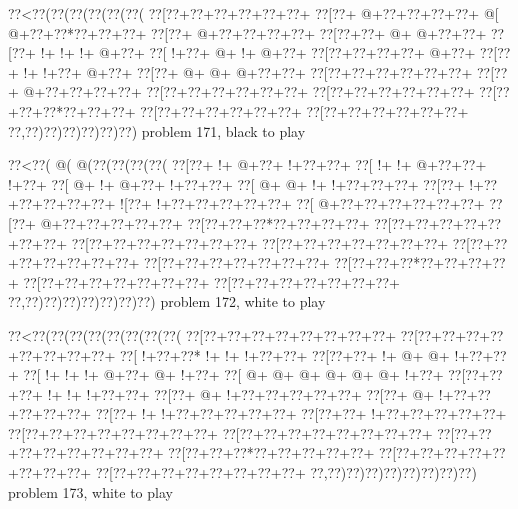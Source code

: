 \vbox{\vbox{\goo
\0??<\0??(\0??(\0??(\0??(\0??(\0??(
\0??[\0??+\0??+\0??+\0??+\0??+\0??+
\0??[\0??+\- @+\0??+\0??+\0??+\0??+
\- @[\- @+\0??+\0??*\0??+\0??+\0??+
\0??[\0??+\- @+\0??+\0??+\0??+\0??+
\0??[\0??+\0??+\- @+\- @+\0??+\0??+
\0??[\0??+\- !+\- !+\- !+\- @+\0??+
\0??[\- !+\0??+\- @+\- !+\- @+\0??+
\0??[\0??+\0??+\0??+\0??+\- @+\0??+
\0??[\0??+\- !+\- !+\0??+\- @+\0??+
\0??[\0??+\- @+\- @+\- @+\0??+\0??+
\0??[\0??+\0??+\0??+\0??+\0??+\0??+
\0??[\0??+\- @+\0??+\0??+\0??+\0??+
\0??[\0??+\0??+\0??+\0??+\0??+\0??+
\0??[\0??+\0??+\0??+\0??+\0??+\0??+
\0??[\0??+\0??+\0??*\0??+\0??+\0??+
\0??[\0??+\0??+\0??+\0??+\0??+\0??+
\0??[\0??+\0??+\0??+\0??+\0??+\0??+
\0??,\0??)\0??)\0??)\0??)\0??)\0??)
}
\hfil problem 171, black to play\hfil\break
}

\vbox{\vbox{\goo
\0??<\0??(\- @(\- @(\0??(\0??(\0??(\0??(
\0??[\0??+\- !+\- @+\0??+\- !+\0??+\0??+
\0??[\- !+\- !+\- @+\0??+\0??+\- !+\0??+
\0??[\- @+\- !+\- @+\0??+\- !+\0??+\0??+
\0??[\- @+\- @+\- !+\- !+\0??+\0??+\0??+
\0??[\0??+\- !+\0??+\0??+\0??+\0??+\0??+
\- ![\0??+\- !+\0??+\0??+\0??+\0??+\0??+
\0??[\- @+\0??+\0??+\0??+\0??+\0??+\0??+
\0??[\0??+\- @+\0??+\0??+\0??+\0??+\0??+
\0??[\0??+\0??+\0??*\0??+\0??+\0??+\0??+
\0??[\0??+\0??+\0??+\0??+\0??+\0??+\0??+
\0??[\0??+\0??+\0??+\0??+\0??+\0??+\0??+
\0??[\0??+\0??+\0??+\0??+\0??+\0??+\0??+
\0??[\0??+\0??+\0??+\0??+\0??+\0??+\0??+
\0??[\0??+\0??+\0??+\0??+\0??+\0??+\0??+
\0??[\0??+\0??+\0??*\0??+\0??+\0??+\0??+
\0??[\0??+\0??+\0??+\0??+\0??+\0??+\0??+
\0??[\0??+\0??+\0??+\0??+\0??+\0??+\0??+
\0??,\0??)\0??)\0??)\0??)\0??)\0??)\0??)
}
\hfil problem 172, white to play\hfil\break
}

\vbox{\vbox{\goo
\0??<\0??(\0??(\0??(\0??(\0??(\0??(\0??(\0??(
\0??[\0??+\0??+\0??+\0??+\0??+\0??+\0??+\0??+
\0??[\0??+\0??+\0??+\0??+\0??+\0??+\0??+\0??+
\0??[\- !+\0??+\0??*\- !+\- !+\- !+\0??+\0??+
\0??[\0??+\0??+\- !+\- @+\- @+\- !+\0??+\0??+
\0??[\- !+\- !+\- !+\- @+\0??+\- @+\- !+\0??+
\0??[\- @+\- @+\- @+\- @+\- @+\- @+\- !+\0??+
\0??[\0??+\0??+\0??+\- !+\- !+\- !+\0??+\0??+
\0??[\0??+\- @+\- !+\0??+\0??+\0??+\0??+\0??+
\0??[\0??+\- @+\- !+\0??+\0??+\0??+\0??+\0??+
\0??[\0??+\- !+\- !+\0??+\0??+\0??+\0??+\0??+
\0??[\0??+\0??+\- !+\0??+\0??+\0??+\0??+\0??+
\0??[\0??+\0??+\0??+\0??+\0??+\0??+\0??+\0??+
\0??[\0??+\0??+\0??+\0??+\0??+\0??+\0??+\0??+
\0??[\0??+\0??+\0??+\0??+\0??+\0??+\0??+\0??+
\0??[\0??+\0??+\0??*\0??+\0??+\0??+\0??+\0??+
\0??[\0??+\0??+\0??+\0??+\0??+\0??+\0??+\0??+
\0??[\0??+\0??+\0??+\0??+\0??+\0??+\0??+\0??+
\0??,\0??)\0??)\0??)\0??)\0??)\0??)\0??)\0??)
}
\hfil problem 173, white to play\hfil\break
}

